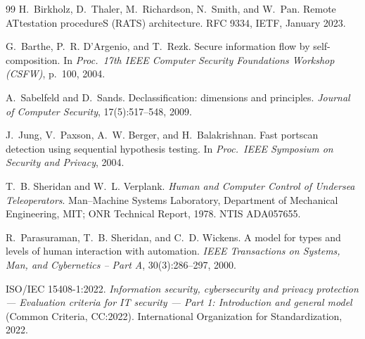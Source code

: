 \documentclass[11pt,a4paper]{article}
\theoremstyle{definition}
\begin{document}
\begin{thebibliography}{99}
 H.~Birkholz, D.~Thaler, M.~Richardson, N.~Smith, and W.~Pan. Remote ATtestation
procedureS (RATS) architecture. RFC 9334, IETF, January 2023.

 G.~Barthe, P.~R. D'Argenio, and T.~Rezk. Secure information flow by
self-composition. In \emph{Proc.\ 17th IEEE Computer Security Foundations Workshop (CSFW)},
p.~100, 2004.

 A.~Sabelfeld and D.~Sands. Declassification: dimensions and principles.
\emph{Journal of Computer Security}, 17(5):517--548, 2009.

 J.~Jung, V.~Paxson, A.~W. Berger, and H.~Balakrishnan. Fast portscan detection
using sequential hypothesis testing. In \emph{Proc.\ IEEE Symposium on Security and Privacy},
2004.

 T.~B. Sheridan and W.~L. Verplank. \emph{Human and Computer
Control of Undersea Teleoperators}. Man--Machine Systems Laboratory, Department of Mechanical
Engineering, MIT; ONR Technical Report, 1978. NTIS ADA057655.

 R.~Parasuraman, T.~B. Sheridan, and C.~D. Wickens. A model for types
and levels of human interaction with automation. \emph{IEEE Transactions on Systems, Man, and
Cybernetics -- Part A}, 30(3):286--297, 2000.

 ISO/IEC 15408-1:2022. \emph{Information security, cybersecurity and privacy
protection --- Evaluation criteria for IT security --- Part 1: Introduction and general model}
(Common Criteria, CC:2022). International Organization for Standardization, 2022.

\end{thebibliography}
\end{document}
